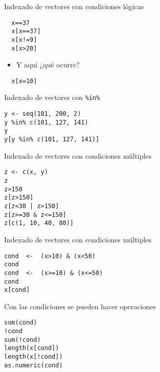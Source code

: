 \documentclass[xcolor={usenames,svgnames,dvipsnames}]{beamer}
\begin{document}
\begin{frame}[fragile,label=sec-2-1-10]{Indexado de vectores con condiciones lógicas}
 \lstset{language=R,label= ,caption= ,numbers=none}
\begin{lstlisting}
  x==37
  x[x==37]
  x[x!=9]
  x[x>20]
\end{lstlisting}

\begin{itemize}
\item Y aquí ¿qué ocurre?
\end{itemize}
\lstset{language=R,label= ,caption= ,numbers=none}
\begin{lstlisting}
  x[x=10]
\end{lstlisting}
\end{frame}

\begin{frame}[fragile,label=sec-2-1-11]{Indexado de vectores con \texttt{\%in\%}}
 \lstset{language=R,label= ,caption= ,numbers=none}
\begin{lstlisting}
y <- seq(101, 200, 2)
y %in% c(101, 127, 141)
y
y[y %in% c(101, 127, 141)]
\end{lstlisting}
\end{frame}

\begin{frame}[fragile,label=sec-2-1-12]{Indexado de vectores con condiciones múltiples}
 \lstset{language=R,label= ,caption= ,numbers=none}
\begin{lstlisting}
z <- c(x, y)
z
z>150
z[z>150]
z[z<30 | z>150]
z[z>=30 & z<=150]
z[c(1, 10, 40, 80)]
\end{lstlisting}
\end{frame}

\begin{frame}[fragile,label=sec-2-1-13]{Indexado de vectores con condiciones múltiples}
 \lstset{language=R,label= ,caption= ,numbers=none}
\begin{lstlisting}
cond  <-  (x>10) & (x<50)
cond
cond  <-  (x>=10) & (x<=50)
cond
x[cond]
\end{lstlisting}
\end{frame}

\begin{frame}[fragile,label=sec-2-1-14]{Con las condiciones se pueden hacer operaciones}
 \lstset{language=R,label= ,caption= ,numbers=none}
\begin{lstlisting}
sum(cond)
!cond
sum(!cond)
length(x[cond])
length(x[!cond])
as.numeric(cond)
\end{lstlisting}
\end{frame}
\end{document}
